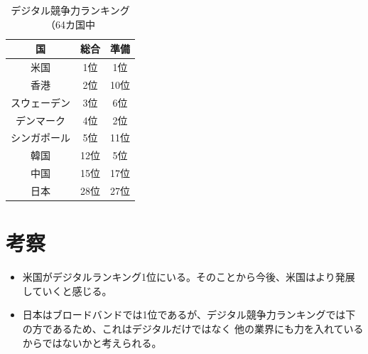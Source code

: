 \documentclass[a4paper,11pt,dvipdfmx]{ujarticle}
\begin{document}

\begin{table}[htbp]
    \centering
    \caption{デジタル競争力ランキング（64カ国中}
    \label{tbl:デジタル}
    \begin{tabular}{|c|c|c|}
        \hline
        国  & 総合 & 準備 \\
        \hline
        米国 & 1位 & 1位 \\
        \hline
        香港 & 2位 & 10位 \\
        \hline
        スウェーデン & 3位 & 6位 \\
        \hline
        デンマーク & 4位 & 2位 \\
        \hline
        シンガポール & 5位 & 11位 \\
        \hline
        \hline
        韓国 & 12位 & 5位 \\
        \hline
        中国 & 15位 & 17位 \\
        \hline
        \hline
        日本 & 28位 & 27位 \\
        \hline
    \end{tabular}
\end{table}

\section{考察}
\begin{itemize}
    \item 米国がデジタルランキング1位にいる。そのことから今後、米国はより発展していくと感じる。
    
    \item 日本はブロードバンドでは1位であるが、デジタル競争力ランキングでは下の方であるため、これはデジタルだけではなく
    他の業界にも力を入れているからではないかと考えられる。
    
\end{itemize}
%

%


\end{document}
